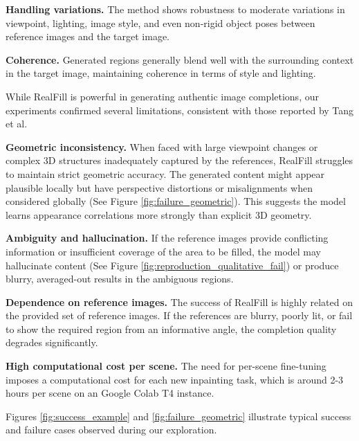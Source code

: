 \documentclass{article}
\begin{document}
\textbf{Handling variations.} The method shows robustness to moderate variations in viewpoint, lighting, image style, and even non-rigid object poses between reference images and the target image.

\textbf{Coherence.} Generated regions generally blend well with the surrounding context in the target image, maintaining coherence in terms of style and lighting.

While RealFill is powerful in generating authentic image completions, our experiments confirmed several limitations, consistent with those reported by Tang et al.

\textbf{Geometric inconsistency.} When faced with large viewpoint changes or complex 3D structures inadequately captured by the references, RealFill struggles to maintain strict geometric accuracy. The generated content might appear plausible locally but have perspective distortions or misalignments when considered globally (See Figure \ref{fig:failure_geometric}). This suggests the model learns appearance correlations more strongly than explicit 3D geometry.

\textbf{Ambiguity and hallucination.} If the reference images provide conflicting information or insufficient coverage of the area to be filled, the model may hallucinate content (See Figure \ref{fig:reproduction_qualitative_fail}) or produce blurry, averaged-out results in the ambiguous regions.

\textbf{Dependence on reference images.} The success of RealFill is highly related on the provided set of reference images. If the references are blurry, poorly lit, or fail to show the required region from an informative angle, the completion quality degrades significantly.

\textbf{High computational cost per scene.} The need for per-scene fine-tuning imposes a computational cost for each new inpainting task, which is around 2-3 hours per scene on an Google Colab T4 instance.

Figures \ref{fig:success_example} and \ref{fig:failure_geometric} illustrate typical success and failure cases observed during our exploration.
\end{document}
